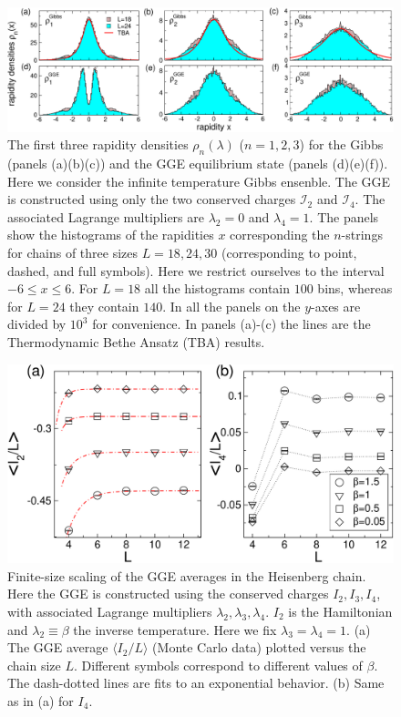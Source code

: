\documentclass[twocolumn,superscriptaddress,prb,10pt]{revtex4-1}
\begin{document}
\begin{figure}[t]
\includegraphics*[width=0.93\linewidth]{./draft_figs/fig2}
\caption{The first three rapidity densities $\rho_n(\lambda)$ ($n=1,2,3$) for the Gibbs 
 (panels (a)(b)(c)) and the GGE equilibrium state (panels (d)(e)(f)). Here we consider 
 the infinite temperature Gibbs ensenble. The GGE is constructed using only the two 
 conserved charges ${\mathcal I}_2$ and ${\mathcal I}_4$. The associated Lagrange 
 multipliers are $\lambda_2=0$ and $\lambda_4=1$. The panels show the histograms 
 of the rapidities $x$ corresponding the $n$-strings for chains of three sizes 
 $L=18,24,30$ (corresponding to point, dashed, and full symbols). Here we restrict 
 ourselves to the interval $-6\le x\le 6$. For $L=18$ all the histograms contain 
 $100$ bins, whereas for $L=24$ they contain $140$. In all the panels on the $y$-axes 
 are divided by $10^3$ for convenience. In panels (a)-(c) the lines are the 
 Thermodynamic Bethe Ansatz (TBA) results. 
}
\label{fig2}
\end{figure}

\begin{figure}[t]
\includegraphics*[width=0.93\linewidth]{./draft_figs/fig3}
\caption{ Finite-size scaling of the GGE averages in the Heisenberg 
 chain. Here the GGE is constructed using the conserved charges $I_2,
 I_3, I_4$, with associated Lagrange multipliers $\lambda_2,\lambda_3,
 \lambda_4$. $I_2$ is the Hamiltonian and $\lambda_2\equiv\beta$ the 
 inverse temperature. Here we fix $\lambda_3=\lambda_4=1$. (a) The 
 GGE average $\langle I_2/L\rangle$ (Monte Carlo data) plotted versus 
 the chain size $L$. Different symbols correspond to different 
 values of $\beta$. The dash-dotted lines are fits to an exponential 
 behavior. (b) Same as in (a) for $I_4$.
}
\label{finite-size}
\end{figure}
\end{document}
